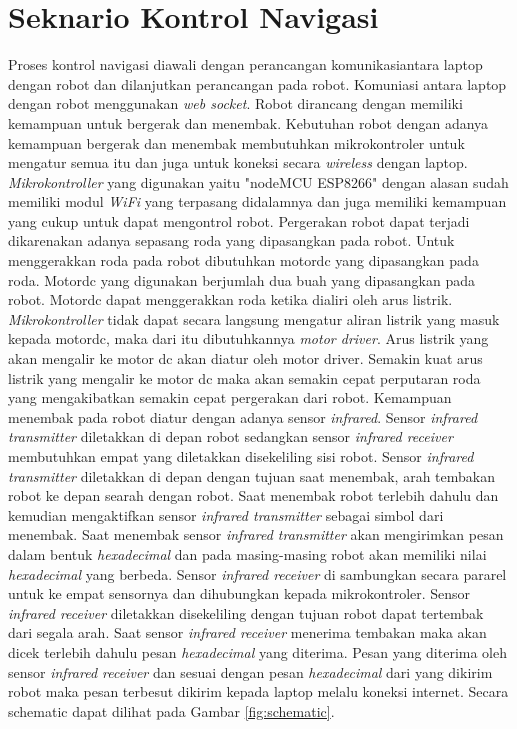\section{Seknario Kontrol Navigasi}
Proses kontrol navigasi diawali dengan perancangan komunikasiantara laptop dengan robot dan dilanjutkan perancangan pada robot. Komuniasi antara laptop dengan robot menggunakan \emph{web socket}. Robot dirancang dengan memiliki kemampuan untuk bergerak dan menembak.  Kebutuhan robot dengan adanya kemampuan bergerak dan menembak membutuhkan mikrokontroler untuk mengatur semua itu dan juga untuk koneksi secara \emph{wireless} dengan laptop. \emph{Mikrokontroller} yang digunakan yaitu "nodeMCU ESP8266" dengan alasan sudah memiliki modul \emph{WiFi} yang terpasang didalamnya dan juga memiliki kemampuan yang cukup untuk dapat mengontrol robot. Pergerakan robot dapat terjadi dikarenakan adanya sepasang roda yang dipasangkan pada robot. Untuk menggerakkan roda pada robot dibutuhkan motordc yang dipasangkan pada roda. Motordc yang digunakan berjumlah dua buah yang dipasangkan pada robot. Motordc dapat menggerakkan roda ketika dialiri oleh arus listrik. \emph{Mikrokontroller} tidak dapat secara langsung mengatur aliran listrik yang masuk kepada motordc, maka dari itu dibutuhkannya \emph{motor driver}. Arus listrik yang akan mengalir ke motor dc akan diatur oleh motor driver. Semakin kuat arus listrik yang mengalir ke motor dc maka akan semakin cepat perputaran roda yang mengakibatkan semakin cepat pergerakan dari robot. Kemampuan menembak pada robot diatur dengan adanya sensor \emph{infrared}. Sensor \emph{infrared transmitter} diletakkan di depan robot sedangkan sensor \emph{infrared receiver} membutuhkan empat yang diletakkan disekeliling sisi robot. Sensor \emph{infrared transmitter} diletakkan di depan dengan tujuan saat menembak, arah tembakan robot ke depan searah dengan robot. Saat menembak robot terlebih dahulu dan kemudian mengaktifkan sensor \emph{infrared transmitter} sebagai simbol dari menembak. Saat menembak sensor \emph{infrared transmitter} akan mengirimkan pesan dalam bentuk \emph{hexadecimal} dan pada masing-masing robot akan memiliki nilai \emph{hexadecimal} yang berbeda. Sensor \emph{infrared receiver} di sambungkan secara pararel untuk ke empat sensornya dan dihubungkan kepada mikrokontroler. Sensor \emph{infrared receiver} diletakkan disekeliling dengan tujuan robot dapat tertembak dari segala arah. Saat sensor \emph{infrared receiver} menerima tembakan maka akan dicek terlebih dahulu pesan \emph{hexadecimal} yang diterima. Pesan yang diterima oleh sensor \emph{infrared receiver} dan sesuai dengan pesan \emph{hexadecimal} dari yang dikirim robot maka pesan terbesut dikirim kepada laptop melalu koneksi internet. Secara schematic dapat dilihat pada Gambar \ref{fig:schematic}.

